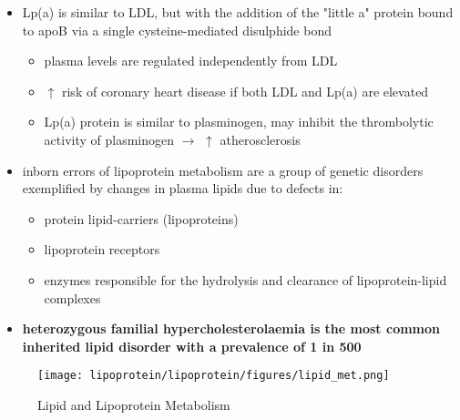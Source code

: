 \documentclass{scrartcl}
\begin{document}
\begin{enumerate}
\begin{itemize}
\item Lp(a) is similar to LDL, but with the addition of the "little a"
protein bound to apoB via a single cysteine-mediated disulphide
bond
\begin{itemize}
\item plasma levels are regulated independently from LDL
\item \(\uparrow\) risk of coronary heart disease if both LDL and Lp(a) are
elevated
\item Lp(a) protein is similar to plasminogen, may inhibit the
thrombolytic activity of plasminogen \(\to\) \(\uparrow\) atherosclerosis
\end{itemize}
\item inborn errors of lipoprotein metabolism are a group of genetic
disorders exemplified by changes in plasma lipids due to defects in:
\begin{itemize}
\item protein lipid-carriers (lipoproteins)
\item lipoprotein receptors
\item enzymes responsible for the hydrolysis and clearance of
lipoprotein-lipid complexes
\end{itemize}
\item \textbf{heterozygous familial hypercholesterolaemia is the most common}
\textbf{inherited lipid disorder with a prevalence of 1 in 500}
\end{itemize}

\begin{figure}[htbp]
\centering
\texttt{[image: lipoprotein/lipoprotein/figures/lipid\_met.png]}
\caption{\label{fig:org7a5e953}Lipid and Lipoprotein Metabolism}
\end{figure}
\end{enumerate}
\end{document}
